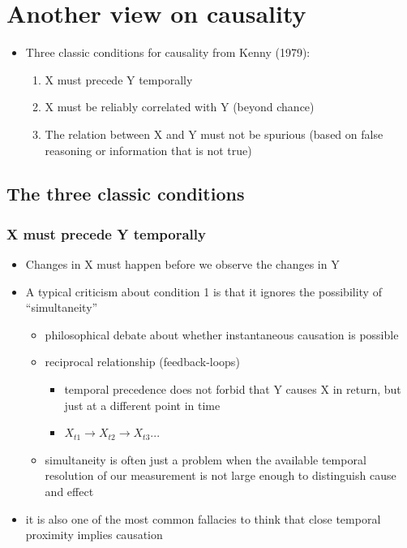 \documentclass[10pt]{article}
\begin{document}
\section{Another view on causality}
\begin{itemize}
    \item Three classic conditions for causality from Kenny (1979):
    \begin{enumerate}
        \item X must precede Y temporally 
        \item X must be reliably correlated with Y (beyond chance)
        \item The relation between X and Y must not be spurious (based on false reasoning or information that is not true)
    \end{enumerate}
\end{itemize}
\subsection{The three classic conditions}
\subsubsection{X must precede Y temporally}
\begin{itemize}
    \item Changes in X must happen before we observe the changes in Y 
    \item A typical criticism about condition 1 is that it ignores the possibility of ``simultaneity''
    \begin{itemize}
        \item philosophical debate about whether instantaneous causation is possible 
        \item reciprocal relationship (feedback-loops)
        \begin{itemize}
            \item temporal precedence does not forbid that Y causes X in return, but just at a different point in time 
            \item $X_{t1} \to X_{t2} \to X_{t3} ... $
        \end{itemize}
        \item simultaneity is often just a problem when the available temporal resolution of our measurement is not large enough to distinguish cause and effect 
    \end{itemize}
    \item it is also one of the most common fallacies to think that close temporal proximity implies causation
\end{itemize}
\newpage 
\end{document}
